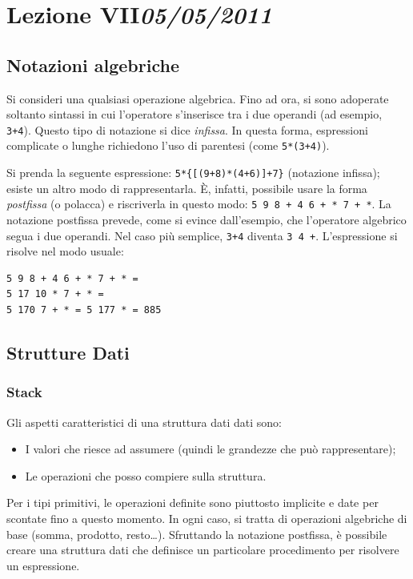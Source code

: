 \chapter[Lezione VII]{Lezione VII\newline\small{\emph{05/05/2011}}}
	\section{Notazioni algebriche}
Si consideri una qualsiasi operazione algebrica. Fino ad ora, si sono adoperate soltanto sintassi in cui l'operatore s'inserisce tra i due operandi (ad esempio, \lstinline!3+4!). Questo tipo di notazione si dice \emph{infissa}. In questa forma, espressioni complicate o lunghe richiedono l'uso di parentesi (come \lstinline!5*(3+4)!).

Si prenda la seguente espressione: \lstinline!5*{[(9+8)*(4+6)]+7}! (notazione infissa); esiste un altro modo di rappresentarla. \`E, infatti, possibile usare la forma \emph{postfissa} (o polacca) e riscriverla in questo modo: \lstinline!5 9 8 + 4 6 + * 7 + *!. La notazione postfissa prevede, come si evince dall'esempio, che l'operatore algebrico segua i due operandi. Nel caso più semplice, \lstinline!3+4! diventa \lstinline!3 4 +!. L'espressione si risolve nel modo usuale:
\begin{center}
\begin{verbatim}
5 9 8 + 4 6 + * 7 + * =
5 17 10 * 7 + * =
5 170 7 + * = 5 177 * = 885
\end{verbatim}
\end{center}


	\section{Strutture Dati}
		\subsection{Stack}
		\label{subsec:stack}
Gli aspetti caratteristici di una struttura dati dati sono:
\begin{itemize}
	\item
I valori che riesce ad assumere (quindi le grandezze che può rappresentare);
	\item
Le operazioni che posso compiere sulla struttura.

\end{itemize}
Per i tipi primitivi, le operazioni definite sono piuttosto implicite e date per scontate fino a questo momento. In ogni caso, si tratta di operazioni algebriche di base (somma, prodotto, resto\dots).
Sfruttando la notazione postfissa, è possibile creare una struttura dati che definisce un particolare procedimento per risolvere un espressione.

